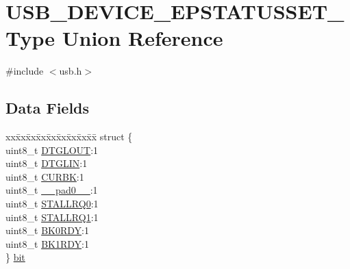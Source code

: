 \hypertarget{union_u_s_b___d_e_v_i_c_e___e_p_s_t_a_t_u_s_s_e_t___type}{}\section{U\+S\+B\+\_\+\+D\+E\+V\+I\+C\+E\+\_\+\+E\+P\+S\+T\+A\+T\+U\+S\+S\+E\+T\+\_\+\+Type Union Reference}
\label{union_u_s_b___d_e_v_i_c_e___e_p_s_t_a_t_u_s_s_e_t___type}


{\ttfamily \#include $<$usb.\+h$>$}

\subsection*{Data Fields}
\begin{DoxyCompactItemize}
\item 
\begin{tabbing}
xx\=xx\=xx\=xx\=xx\=xx\=xx\=xx\=xx\=\kill
struct \{\\
\>uint8\_t \mbox{\hyperlink{union_u_s_b___d_e_v_i_c_e___e_p_s_t_a_t_u_s_s_e_t___type_a343a1d674b60760cbd9b9a227855a18d}{DTGLOUT}}:1\\
\>uint8\_t \mbox{\hyperlink{union_u_s_b___d_e_v_i_c_e___e_p_s_t_a_t_u_s_s_e_t___type_a4d3e03af44b8a3aab6216f737f671b2d}{DTGLIN}}:1\\
\>uint8\_t \mbox{\hyperlink{union_u_s_b___d_e_v_i_c_e___e_p_s_t_a_t_u_s_s_e_t___type_a60af70f2b5f295e7d0fad0cf6c31afb8}{CURBK}}:1\\
\>uint8\_t \mbox{\hyperlink{union_u_s_b___d_e_v_i_c_e___e_p_s_t_a_t_u_s_s_e_t___type_a8b4eebe79ded0459acec2f4950102ba3}{\_\_pad0\_\_}}:1\\
\>uint8\_t \mbox{\hyperlink{union_u_s_b___d_e_v_i_c_e___e_p_s_t_a_t_u_s_s_e_t___type_a1b62d73ab84a16453cfe76dbae8e652c}{STALLRQ0}}:1\\
\>uint8\_t \mbox{\hyperlink{union_u_s_b___d_e_v_i_c_e___e_p_s_t_a_t_u_s_s_e_t___type_aff69880ca0480a1518048272fd4b415c}{STALLRQ1}}:1\\
\>uint8\_t \mbox{\hyperlink{union_u_s_b___d_e_v_i_c_e___e_p_s_t_a_t_u_s_s_e_t___type_ae775e6182e0864ef4c8f1b31e8fc05df}{BK0RDY}}:1\\
\>uint8\_t \mbox{\hyperlink{union_u_s_b___d_e_v_i_c_e___e_p_s_t_a_t_u_s_s_e_t___type_a2bce60d1c409a249682ac9f0abd43e22}{BK1RDY}}:1\\
\} \mbox{\hyperlink{union_u_s_b___d_e_v_i_c_e___e_p_s_t_a_t_u_s_s_e_t___type_af64178ccf751cdcaef35b98f30e1ec4c}{bit}}\\


\end{tabbing}
\end{DoxyCompactItemize}
